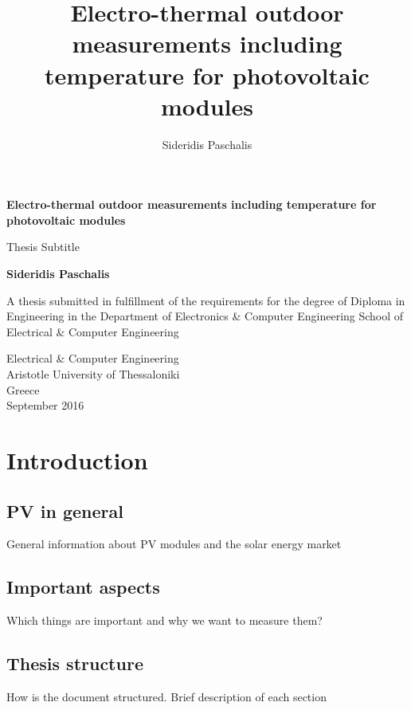 \documentclass[11pt,a4paper]{report}
\author{Sideridis Paschalis}
\title{Electro-thermal outdoor measurements including temperature for photovoltaic modules}
\begin{document}
\begin{titlepage}
    \begin{center}
        \vspace*{1cm}
        
        \Huge
        \textbf{Electro-thermal outdoor measurements including temperature for photovoltaic modules}
        
        \vspace{0.5cm}
        \LARGE
        Thesis Subtitle
        
        \vspace{1.5cm}
        
        \textbf{Sideridis Paschalis}
        
        \vfill
        A thesis submitted in fulfillment of the requirements for the degree of Diploma in Engineering in the Department of Electronics \& Computer Engineering	School of Electrical \& Computer Engineering        
        \vspace{0.8cm}
        
        
        \Large
        Electrical \& Computer Engineering\\
        Aristotle University of Thessaloniki\\
        Greece\\
        September 2016\\
        
    \end{center}
\end{titlepage}

\tableofcontents

\chapter{Introduction}
\section{PV in general}
General information about PV modules and the solar energy market
\section{Important aspects}
Which things are important and why we want to measure them?
\section{Thesis structure}
How is the document structured. Brief description of each section
\end{document}
